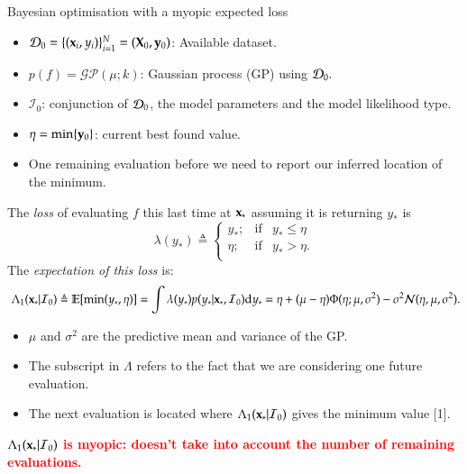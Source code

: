 \documentclass[15pt,serif,mathserif,final]{beamer}
\newcommand{\I}{\mathcal{I}}
\newcommand{\ud}{\mathrm{d}}
\newcommand{\E}{\mathbb{E}}
\begin{document}
\begin{frame}{}
\begin{columns}[t]
\begin{column}{0.32\linewidth}
\begin{block}{Bayesian optimisation with a myopic expected loss}
\begin{itemize}
\item $\dataSet_0 = \{(\latentVector_i,\dataScalar_i)\}_{i=1}^N = (\latentMatrix_0,\dataVector_0)$: Available dataset. 
\item $p(f) = \mathcal{GP}(\mu; k)$: Gaussian process (GP) using $\mathcal{D}_0.$
\item $\I_0$: conjunction of $\mathcal{D}_0$, the model parameters and the model likelihood type.
\item $\eta = \min \{\mathbf{y}_0\}$: current best found value.
\item One remaining evaluation before we need to report our inferred location of the minimum.
\end{itemize}
      
The \textcolor{mycolor}{\emph{loss}} of evaluating $f$ this last time at $\mathbf{x}_*$ assuming it is returning $y_*$ is
$$\lambda(y_*)\triangleq \left\{ \begin{array}{lcl}
y_*;             & \mbox{if}  &  y_* \leq \eta \\
 \eta; & \mbox{if}  & y_* > \eta. \\
\end{array}
\right.$$
The \textcolor{mycolor}{\emph{expectation of this loss}} is:
$$\ \Lambda_1(\latentVector_*| \I_0) \triangleq \E[ \min (y_*,\eta)]= \int \lambda(y_*)p(y_* |\latentVector_*,\I_0)\ud y_* =  \eta +(\mu  - \eta) \Phi (\eta ; \mu, \sigma^2) - \sigma^2 \mathcal{N} (\eta, \mu, \sigma^2).$$
\begin{itemize}
\item $\mu$ and $\sigma^2$ are the predictive mean and variance of the GP.
\item The subscript in $\Lambda$ refers to the fact that we are considering one future evaluation.  
\item The next evaluation is located  where $\Lambda_1(\latentVector_*| \I_0) $ gives the minimum value [1].
\end{itemize}

 \begin{center}
 \textcolor{red}{\textbf{$\Lambda_1(\latentVector_*| \I_0)$ is myopic: doesn't take into account the number of remaining evaluations.}}
\end{center}


\end{block}
\end{column}
\end{columns}
\end{frame}
\end{document}
